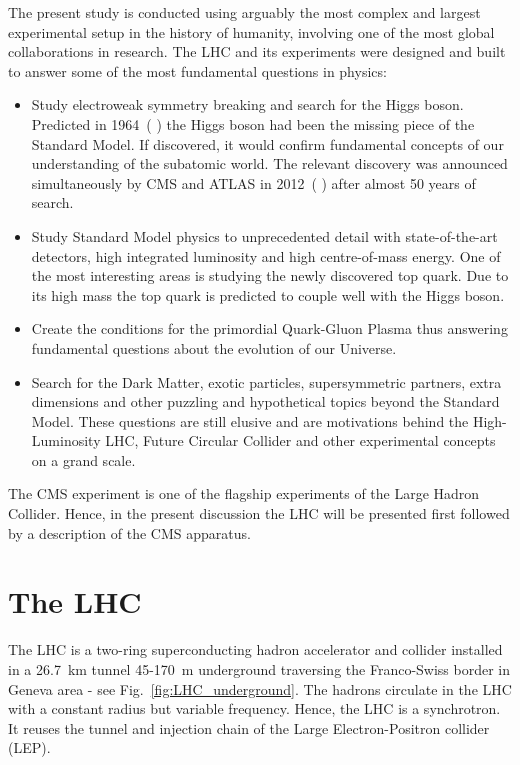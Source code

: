 The present study is conducted using arguably the most complex and largest experimental setup in the history of humanity, involving one of the most global collaborations in research. The LHC and its experiments were designed and built to answer some of the most fundamental questions in physics:

\begin{itemize}
\item Study electroweak symmetry breaking and search for the Higgs boson. Predicted in 1964~(\cite{Higgs:1964ia} \cite{Englert:1964et}) the Higgs boson had been the missing piece of the Standard Model. If discovered, it would confirm fundamental concepts of our understanding of the subatomic world. The relevant discovery was announced simultaneously by CMS and ATLAS in 2012~(\cite{Chatrchyan:2012xdj} \cite{Aad:2012tfa}) after almost 50 years of search.
\item Study Standard Model physics to unprecedented detail with state-of-the-art detectors, high integrated luminosity and high centre-of-mass energy. One of the most interesting areas is studying the newly discovered top quark. Due to its high mass the top quark is predicted to couple well with the Higgs boson.
\item Create the conditions for the primordial Quark-Gluon Plasma thus answering fundamental questions about the evolution of our Universe.
\item Search for the Dark Matter, exotic particles, supersymmetric partners, extra dimensions and other puzzling and hypothetical topics beyond the Standard Model. These questions are still elusive and are motivations behind the High-Luminosity LHC, Future Circular Collider and other experimental concepts on a grand scale.
\end {itemize}

The CMS experiment is one of the flagship experiments of the Large Hadron Collider. Hence, in the present discussion the LHC will be presented first followed by a description of the CMS apparatus.

\section{The LHC}

The LHC is a two-ring superconducting hadron accelerator and collider installed in a 26.7~km tunnel 45-170~m underground traversing the Franco-Swiss border in Geneva area - see Fig.~\ref{fig:LHC_underground}. The hadrons circulate in the LHC with a constant radius but variable frequency. Hence, the LHC is a synchrotron. It reuses the tunnel and injection chain of the Large Electron-Positron collider (LEP).

